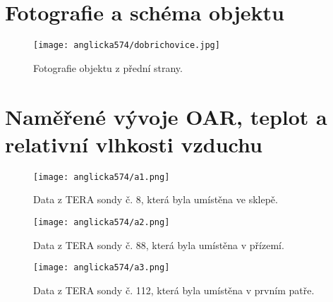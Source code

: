 \section{Fotografie a schéma objektu}
\begin{figure}[ht]
    \centering
    \texttt{[image: anglicka574/dobrichovice.jpg]}
    \caption{Fotografie objektu z přední strany.}
    \label{fig:anglicka574_fotografie}
\end{figure}
\section{Naměřené vývoje OAR, teplot a relativní vlhkosti vzduchu}
\begin{figure}[ht]
    \centering
    \texttt{[image: anglicka574/a1.png]}
    \caption{Data z TERA sondy č. 8, která byla umístěna ve sklepě.}
    \label{fig:anglicka574_a1}
\end{figure}
\begin{figure}[ht]
    \centering
    \texttt{[image: anglicka574/a2.png]}
    \caption{Data z TERA sondy č. 88, která byla umístěna v přízemí.}
    \label{fig:anglicka574_a2}
\end{figure}
\begin{figure}[ht]
    \centering
    \texttt{[image: anglicka574/a3.png]}
    \caption{Data z TERA sondy č. 112, která byla umístěna v prvním patře.}
    \label{fig:anglicka574_a3}
\end{figure}

